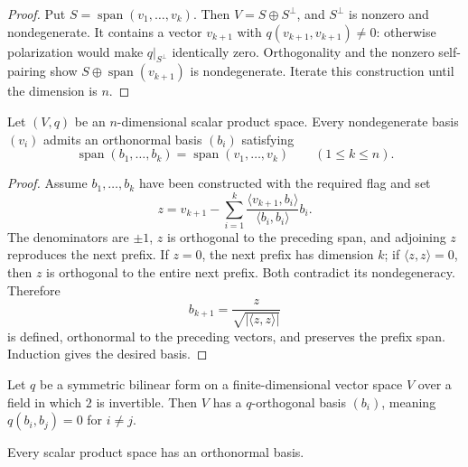 \begin{proof}
\leanok
{}
\sketch Put $S=\operatorname{span}(v_1,\ldots,v_k)$. Then
$V=S\oplus S^\perp$, and $S^\perp$ is nonzero and nondegenerate. It contains a
vector $v_{k+1}$ with $q(v_{k+1},v_{k+1})\ne0$: otherwise polarization would make
$q|_{S^\perp}$ identically zero. Orthogonality and the nonzero self-pairing show
$S\oplus\operatorname{span}(v_{k+1})$ is nondegenerate. Iterate this construction
until the dimension is $n$.
\end{proof}

\begin{proposition}
\label{prop:gram-schmidt-algorithm-scalar-products}
\leanok
{}
Let $(V,q)$ be an $n$-dimensional scalar product space. Every nondegenerate basis
$(v_i)$ admits an orthonormal basis $(b_i)$ satisfying
\[
\operatorname{span}(b_1,\ldots,b_k)
=\operatorname{span}(v_1,\ldots,v_k)
\qquad(1\leq k\leq n).
\]
\end{proposition}

\begin{proof}
\leanok
{}
\sketch Assume $b_1,\ldots,b_k$ have been constructed with the required flag and
set
\[
z=v_{k+1}-\sum_{i=1}^k
\frac{\langle v_{k+1},b_i\rangle}{\langle b_i,b_i\rangle}b_i.
\]
The denominators are $\pm1$, $z$ is orthogonal to the preceding span, and adjoining
$z$ reproduces the next prefix. If $z=0$, the next prefix has dimension $k$; if
$\langle z,z\rangle=0$, then $z$ is orthogonal to the entire next prefix. Both
contradict its nondegeneracy. Therefore
\[
b_{k+1}=\frac{z}{\sqrt{|\langle z,z\rangle|}}
\]
is defined, orthonormal to the preceding vectors, and preserves the prefix span.
Induction gives the desired basis.
\end{proof}

\begin{proposition}
\label{prop:symmetric-bilinear-orthogonal-basis}
\mathlibok
Let $q$ be a symmetric bilinear form on a finite-dimensional vector space $V$
over a field in which $2$ is invertible. Then $V$ has a $q$-orthogonal basis
$(b_i)$, meaning $q(b_i,b_j)=0$ for $i\ne j$.
\end{proposition}

\begin{proposition}
\label{prop:scalar-product-orthonormal-basis}
\leanok
{}
Every scalar product space has an orthonormal basis.
\end{proposition}

